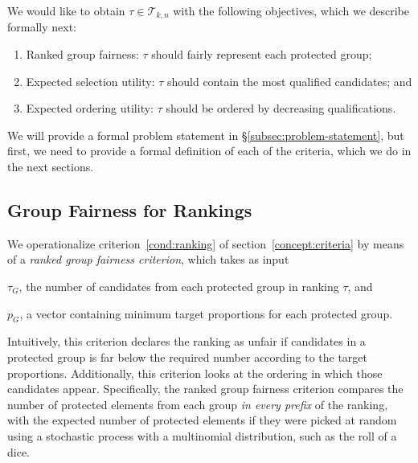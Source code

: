 \label{concept:criteria}
We would like to obtain $\tau \in {\mathcal T}_{k,n}$ with the following objectives, which we describe formally next: %

\begin{enumerate}[{Criterion} 1.]
	\item Ranked group fairness: $\tau$ should fairly represent each protected group; \label{cond:ranking}

	\item Expected selection utility: $\tau$ should contain the most qualified candidates; and \label{cond:selection}

	\item Expected ordering utility: $\tau$ should be ordered by decreasing qualifications.\label{cond:ordering}
\end{enumerate}

We will provide a formal problem statement in \S\ref{subsec:problem-statement}, but first, we need to provide a formal definition of each of the criteria, which we do in the next sections.

\subsection{Group Fairness for Rankings}
\label{subsec:group-fairness}

We operationalize criterion~\ref{cond:ranking} of section~\ref{concept:criteria} by means of a \emph{ranked group fairness criterion}, which takes as input
\begin{inparaenum}[(i)]
	\item $ \tau_G $, the number of candidates from each protected group in ranking $ \tau $, and
	\item $ p_G $, a vector containing minimum target proportions for each protected group.
\end{inparaenum}
Intuitively, this criterion declares the ranking as unfair if candidates in a protected group is far below the required number according to the target proportions.
%
Additionally, this criterion looks at the ordering in which those candidates appear.
%
Specifically, the ranked group fairness criterion compares the number of protected elements from each group \emph{in every prefix} of the ranking, with the expected number of protected elements if they were picked at random using a stochastic process with a multinomial distribution, such as the roll of a dice.

